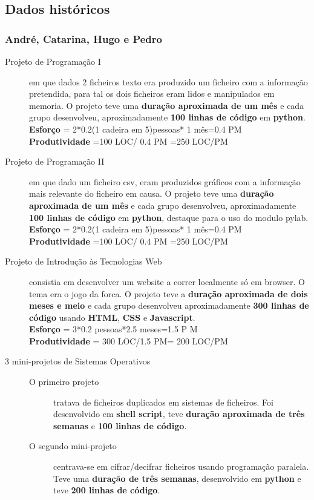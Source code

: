 \documentclass[a4paper]{report}
\begin{document}
\subsection{Dados históricos}
\subsubsection*{André, Catarina, Hugo e Pedro} 
\begin{description}
\item[Projeto de Programação I] em que dados 2 ficheiros texto era produzido um ficheiro com a informação pretendida, para tal os dois ficheiros eram lidos e manipulados em memoria. O projeto teve uma \textbf{duração aproximada de um mês} e cada grupo desenvolveu, aproximadamente \textbf{100 linhas de código} em \textbf{python}.\\\textbf{Esforço} = 2*0.2(1 cadeira em 5)pessoas* 1 mês=0.4 PM\\ \textbf{Produtividade} =100 LOC/ 0.4 PM =250 LOC/PM

\item[Projeto de Programação II] em que dado um ficheiro csv, eram produzidos gráficos com a informação mais relevante do ficheiro em causa. O projeto teve uma \textbf{duração aproximada de um mês} e cada grupo desenvolveu, aproximadamente \textbf{100 linhas de código} em \textbf{python}, destaque para o uso do modulo pylab.\\\textbf{Esforço} = 2*0.2(1 cadeira em 5)pessoas* 1 mês=0.4 PM\\ \textbf{Produtividade} =100 LOC/ 0.4 PM =250 LOC/PM

\item [Projeto de Introdução às Tecnologias Web] consistia em desenvolver um website a correr localmente só em browser. O tema era o jogo da forca. O projeto teve a \textbf{duração aproximada de dois meses e meio} e cada grupo desenvolveu aproximadamente \textbf{300 linhas de código} usando \textbf{HTML}, \textbf{CSS} e \textbf{Javascript}.\\\textbf{Esforço} = 3*0.2 pessoas*2.5 meses=1.5 P M\\ \textbf{Produtividade} = 300 LOC/1.5 PM= 200 LOC/PM

\item[3 mini-projetos de Sistemas Operativos]\mbox{}
	\begin{description}
		\item[O primeiro projeto] tratava de ficheiros duplicados em sistemas de ficheiros. Foi desenvolvido em \textbf{shell script}, teve \textbf{duração aproximada de três semanas} e \textbf{100 linhas de código}.		
		\item [O segundo mini-projeto] centrava-se em cifrar/decifrar ficheiros usando programação paralela. Teve uma \textbf{duração de três semanas}, desenvolvido em \textbf{python} e teve \textbf{200 linhas de código}.
		

\end{description}
\end{description}
\end{document}
